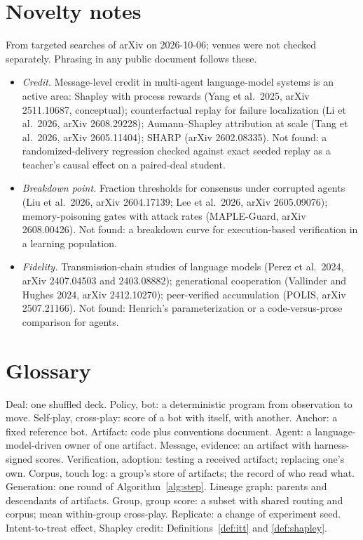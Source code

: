 \documentclass[11pt]{article}
\numberwithin{theorem}{section}
\theoremstyle{definition}
\theoremstyle{problemstyle}
\begin{document}
\section{Novelty notes}\label{app:novelty}
From targeted searches of arXiv on 2026-10-06; venues were not checked separately. Phrasing in any public document
follows these.
\begin{itemize}
\item \emph{Credit.} Message-level credit in multi-agent language-model systems is an active area: Shapley with process
rewards (Yang et al.\ 2025, arXiv 2511.10687, conceptual); counterfactual replay for failure localization (Li et al.\
2026, arXiv 2608.29228); Aumann--Shapley attribution at scale (Tang et al.\ 2026, arXiv 2605.11404); SHARP (arXiv
2602.08335). Not found: a randomized-delivery regression checked against exact seeded replay as a teacher's causal
effect on a paired-deal student.
\item \emph{Breakdown point.} Fraction thresholds for consensus under corrupted agents (Liu et al.\ 2026, arXiv
2604.17139; Lee et al.\ 2026, arXiv 2605.09076); memory-poisoning gates with attack rates (MAPLE-Guard, arXiv
2608.00426). Not found: a breakdown curve for execution-based verification in a learning population.
\item \emph{Fidelity.} Transmission-chain studies of language models (Perez et al.\ 2024, arXiv 2407.04503 and
2403.08882); generational cooperation (Vallinder and Hughes 2024, arXiv 2412.10270); peer-verified accumulation (POLIS,
arXiv 2507.21166). Not found: Henrich's parameterization or a code-versus-prose comparison for agents.
\end{itemize}

\section{Glossary}
Deal: one shuffled deck. Policy, bot: a deterministic program from observation to move. Self-play, cross-play: score of
a bot with itself, with another. Anchor: a fixed reference bot. Artifact: code plus conventions document. Agent: a
language-model-driven owner of one artifact. Message, evidence: an artifact with harness-signed scores. Verification,
adoption: testing a received artifact; replacing one's own. Corpus, touch log: a group's store of artifacts; the
record of who read what. Generation: one round of Algorithm~\ref{alg:step}. Lineage graph: parents and descendants of
artifacts. Group, group score: a subset with shared routing and corpus; mean within-group cross-play. Replicate: a change
of experiment seed. Intent-to-treat effect, Shapley credit: Definitions~\ref{def:itt} and \ref{def:shapley}.
\end{document}
